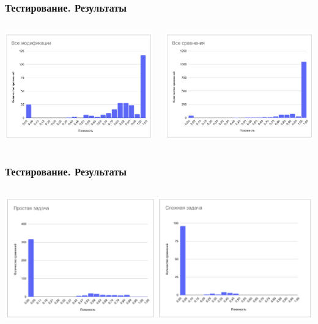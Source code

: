\documentclass[10pt]{beamer}
\begin{document}
\begin{frame}\frametitle{Тестирование. Результаты}
		\begin{columns}[C]
			\centering
			\includegraphics[scale=0.27]{res3.png}
			 
			\centering
			\includegraphics[scale=0.27]{res4.png}
			
		\end{columns}
	\end{frame}
		
		
\begin{frame}\frametitle{Тестирование. Результаты}
	\begin{columns}[T]
		\column{\textwidth}
		\centering
		\includegraphics[scale=0.26]{res5.png}
	\end{columns}
\end{frame}
\end{document}
